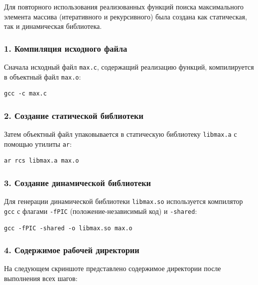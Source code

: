 Для повторного использования реализованных функций поиска максимального элемента массива (итеративного и рекурсивного) была создана как статическая, так и динамическая библиотека.

\subsubsection*{1. Компиляция исходного файла}

Сначала исходный файл \texttt{max.c}, содержащий реализацию функций, компилируется в объектный файл \texttt{max.o}:

\begin{lstlisting}
gcc -c max.c
\end{lstlisting}

\subsubsection*{2. Создание статической библиотеки}

Затем объектный файл упаковывается в статическую библиотеку \texttt{libmax.a} с помощью утилиты \texttt{ar}:

\begin{lstlisting}
ar rcs libmax.a max.o
\end{lstlisting}

\subsubsection*{3. Создание динамической библиотеки}

Для генерации динамической библиотеки \texttt{libmax.so} используется компилятор \texttt{gcc} с флагами \texttt{-fPIC} (положение-независимый код) и \texttt{-shared}:

\begin{lstlisting}
gcc -fPIC -shared -o libmax.so max.o
\end{lstlisting}

\subsubsection*{4. Содержимое рабочей директории}

На следующем скриншоте представлено содержимое директории после выполнения всех шагов:

